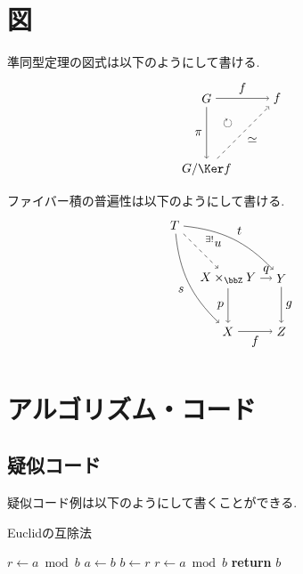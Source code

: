 \documentclass[10pt]{ltjsarticle}
\begin{document}
\section{図}

準同型定理の図式は以下のようにして書ける.
\begin{align}
	\begin{tikzpicture}[auto]
		\node (G) at (0, 2) {$G$};
		\node (Imf) at (2, 2) {$\Im f$};
		\node (GKerf) at (0, 0) {$G/\Ker f$};
		\node (Circle) at (0.6, 1.3) {$\circlearrowright$};
		\draw[->] (G) to node {$f$} (Imf);
		\draw[->] (G) to node[swap] {$\pi$} (GKerf);
		\draw[->, dashed] (GKerf) to node[swap] {$\simeq$} (Imf);
	\end{tikzpicture}
\end{align}
ファイバー積の普遍性は以下のようにして書ける.
\begin{align}
	\begin{tikzpicture}[auto]
		\node (T) at (0, 3) {$T$};
		\node (X) at (1.5, 0) {$X$};
		\node (XxY) at (1.5, 1.5) {$X\times_{\bbZ}Y$};
		\node (Z) at (3, 0) {$Z$};
		\node (Y) at (3, 1.5) {$Y$};
		\draw[->, dashed] (T) to node {${}^{\exists!}u$} (XxY);
		\draw[->] (T) to[bend left=20] node {$t$} (Y);
		\draw[->] (T) to[bend right=20] node[swap] {$s$} (X);
		\draw[->] (XxY) to node {$q$} (Y);
		\draw[->] (XxY) to node[swap] {$p$} (X);
		\draw[->] (Y) to node {$g$} (Z);
		\draw[->] (X) to node[swap] {$f$} (Z);
	\end{tikzpicture}
\end{align}
\newpage
\section{アルゴリズム・コード}

\subsection{疑似コード}

疑似コード例は以下のようにして書くことができる.

\begin{algorithm}

	\caption{Euclidの互除法}
	
	\begin{algorithmic}[1]

			\State $r\gets a\bmod b$
			 
				\State $a\gets b$
				\State $b\gets r$
				\State $r\gets a\bmod b$
			\EndWhile
			\State \textbf{return} $b$
		\EndFunction

	\end{algorithmic}

\end{algorithm}
\end{document}
